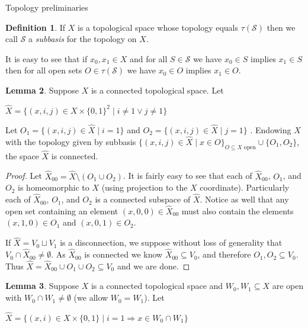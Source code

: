 \documentclass{amsart}
\theoremstyle{definition}\newtheorem{theorem}{Theorem}
\theoremstyle{definition}\newtheorem{bigtheorem}{Theorem}
\numberwithin{theorem}{section}
\theoremstyle{definition}\newtheorem{corollary}[theorem]{Corollary}
\theoremstyle{definition}\newtheorem{proposition}[theorem]{Proposition}
\theoremstyle{definition}\newtheorem{definition}[theorem]{Definition}
\theoremstyle{definition}\newtheorem{question}[theorem]{Question}
\theoremstyle{definition}\newtheorem{example}[theorem]{Example}
\theoremstyle{definition}\newtheorem{remark}[theorem]{Remark}
\theoremstyle{definition}\newtheorem{note}[theorem]{Note}
\theoremstyle{definition}\newtheorem{lemma}[theorem]{Lemma}
\theoremstyle{definition}\newtheorem{fact}[theorem]{Fact}
\theoremstyle{definition}\newtheorem{define}[theorem]{Definition}
\theoremstyle{definition}\newtheorem{definitions}[theorem]{Definitions}
\theoremstyle{definition}\newtheorem{claim}[theorem]{Claim}
\theoremstyle{definition}\newtheorem{obs}[theorem]{Observation}
\theoremstyle{definition}\newtheorem{construction}[theorem]{Construction}
\begin{document}
\begin{section}{Topology preliminaries}
\begin{definition}If $X$ is a topological space whose topology equals $\tau(\mathcal{S})$ then we call $\mathcal{S}$ a \emph{subbasis} for the topology on $X$.
\end{definition}

It is easy to see that if $x_0, x_1 \in X$ and for all $S \in \mathcal{S}$ we have $x_0 \in S$ implies $x_1\in S$ then for all open sets $O \in \tau(\mathcal{S})$ we have $x_0\in O$ implies $x_1 \in O$.

\begin{lemma}\label{makingHausdorff}  Suppose $X$ is a connected topological space.  Let

\begin{center}
$\hat{X} = \{(x, i, j) \in X \times \{0, 1\}^2\mid i\neq 1 \vee j\neq 1\}$
\end{center}

\noindent Let $O_1 =\{(x, i, j) \in \hat{X}\mid i = 1\}$ and $O_2 = \{(x, i, j)\in \hat{X} \mid j =1\}$ .  Endowing $\hat{X}$ with the topology given by subbasis $\{(x, i, j)\in \hat{X} \mid x\in O\}_{O \subseteq X \text{ open}} \cup \{O_1, O_2\}$, the space $\hat{X}$ is connected.
\end{lemma}

\begin{proof}  Let $\hat{X}_{00} = \hat{X} \setminus (O_1 \cup O_2)$.  It is fairly easy to see that each of $\hat{X}_{00}$, $O_1$, and $O_2$ is homeomorphic to $X$ (using projection to the $X$ coordinate).  Particularly each of $\hat{X}_{00}$, $O_1$, and $O_2$ is a connected subspace of $\hat{X}$.  Notice as well that any open set containing an element $(x, 0, 0) \in \hat{X}_{00}$ must also contain the elements $(x, 1, 0) \in O_1$ and $(x, 0, 1) \in O_2$.

If $\hat{X} = V_0 \sqcup V_1$ is a disconnection, we suppose without loss of generality that $V_0 \cap \hat{X}_{00} \neq \emptyset$.  As $\hat{X}_{00}$ is connected we know $\hat{X}_{00} \subseteq V_0$, and therefore $O_1, O_2 \subseteq V_0$.  Thus $\hat{X} = \hat{X}_{00} \cup O_1 \cup O_2 \subseteq V_0$ and we are done.
\end{proof}

\begin{lemma}\label{makingbasis}  Suppose $X$ is a connected topological space and $W_0, W_1 \subseteq X$ are open with $W_0 \cap W_1 \neq \emptyset$ (we allow $W_0 = W_1$).  Let


\begin{center}
$\hat{X} = \{(x, i) \in X \times \{0, 1\}\mid i = 1 \Rightarrow x\in W_0 \cap W_1\}$
\end{center}


\end{lemma}
\end{section}
\end{document}

